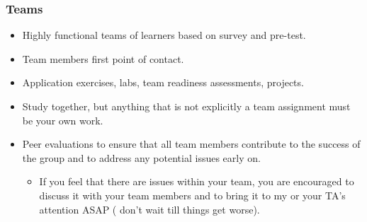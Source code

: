 \documentclass[11pt,containsverbatim,handout,xcolor=xelatex,dvipsnames,table]{beamer}
\begin{document}
\begin{frame}
\frametitle{Teams}

\begin{itemize}
\item Highly functional teams of learners based on survey and pre-test.

\item Team members first point of contact.

\item Application exercises, labs, team readiness assessments, projects.

\item Study together, but anything that is not explicitly a team assignment must be 
your own work.

\item Peer evaluations to ensure that all team members contribute to the success of 
the group and to address any potential issues early on.
\begin{itemize}
\item If you feel that there are issues within your team, you are encouraged to 
discuss it with your team members and to bring it to my or your TA's attention ASAP (
don't wait till things get worse).
\end{itemize}

\end{itemize}


\end{frame}

\end{document}
